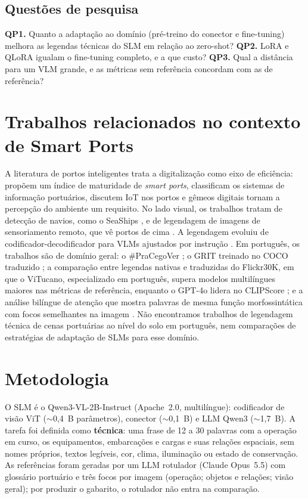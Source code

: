 \documentclass[12pt]{article}
\begin{document}
\subsection{Questões de pesquisa}

\textbf{QP1.} Quanto a adaptação ao domínio (pré-treino do conector e
fine-tuning) melhora as legendas técnicas do SLM em relação ao zero-shot?
\textbf{QP2.} LoRA e QLoRA igualam o fine-tuning completo, e a que custo?
\textbf{QP3.} Qual a distância para um VLM grande, e as métricas sem
referência concordam com as de referência?

\section{Trabalhos relacionados no contexto de Smart Ports}

A literatura de portos inteligentes trata a digitalização como eixo de
eficiência:  propõem um índice de maturidade de
\textit{smart ports},  classificam os sistemas de
informação portuários,  discutem IoT nos portos e
gêmeos digitais \cite{klar2023} tornam a percepção do ambiente um requisito.
No lado visual, os trabalhos tratam de detecção de navios, como o SeaShips
\cite{shao2018}, e de legendagem de imagens de sensoriamento remoto, que vê
portos de cima \cite{lu2018}. A legendagem evoluiu de
codificador-decodificador \cite{vinyals2015,xu2015} para VLMs ajustados por
instrução \cite{liu2023}. Em português, os trabalhos são de domínio geral: o
\#PraCegoVer \cite{santos2022}; o GRIT treinado no COCO traduzido
\cite{alencar2024}; a comparação entre legendas nativas e traduzidas do
Flickr30K, em que o ViTucano, especializado em português, supera modelos
multilíngues maiores nas métricas de referência, enquanto o GPT-4o lidera no
CLIPScore \cite{bromonschenkel2026}; e a análise bilíngue de atenção que
mostra palavras de mesma função morfossintática com focos semelhantes na
imagem \cite{gondim2025}. Não encontramos trabalhos de legendagem técnica de cenas
portuárias ao nível do solo em português, nem comparações de estratégias de
adaptação \cite{hu2022,dettmers2023} de SLMs para esse domínio.

\section{Metodologia}

O SLM é o Qwen3-VL-2B-Instruct \cite{qwen3vl} (Apache~2.0, multilíngue):
codificador de visão ViT ($\sim$0,4~B parâmetros), conector ($\sim$0,1~B) e
LLM Qwen3 ($\sim$1,7~B). A tarefa foi definida como \textbf{técnica}: uma frase de 12
a 30 palavras com a operação em curso, os equipamentos, embarcações e cargas
e suas relações espaciais, sem nomes próprios, textos legíveis, cor, clima,
iluminação ou estado de conservação. As referências foram geradas por um LLM
rotulador (Claude Opus~5.5) com glossário portuário e três focos por imagem
(operação; objetos e relações; visão geral); por produzir o gabarito, o
rotulador não entra na comparação.
\end{document}
